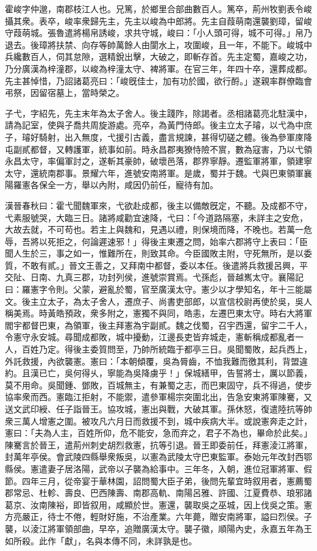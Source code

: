 
\begin{pinyinscope}
霍峻字仲邈，南郡枝江人也。兄篤，於鄉里合部曲數百人。篤卒，荊州牧劉表令峻攝其衆。表卒，峻率衆歸先主，先主以峻為中郎將。先主自葭萌南還襲劉璋，留峻守葭萌城。張魯遣將楊帛誘峻，求共守城，峻曰：「小人頭可得，城不可得。」帛乃退去。後璋將扶禁、向存等帥萬餘人由閬水上，攻圍峻，且一年，不能下。峻城中兵纔數百人，伺其怠隙，選精銳出擊，大破之，即斬存首。先主定蜀，嘉峻之功，乃分廣漢為梓潼郡，以峻為梓潼太守、裨將軍。在官三年，年四十卒，還葬成都。先主甚悼惜，乃詔諸葛亮曰：「峻旣佳士，加有功於國，欲行酹。」遂親率群僚臨會弔祭，因留宿墓上，當時榮之。

子弋，字紹先，先主末年為太子舍人。後主踐阼，除謁者。丞相諸葛亮北駐漢中，請為記室，使與子喬共周旋游處。亮卒，為黃門侍郎。後主立太子璿，以弋為中庶子，璿好騎射，出入無度，弋援引古義，盡言規諫，甚得切磋之體。後為參軍庲降屯副貳都督，又轉護軍，統事如前。時永昌郡夷獠恃險不賔，數為寇害，乃以弋領永昌太守，率偏軍討之，遂斬其豪帥，破壞邑落，郡界寧靜。遷監軍將軍，領建寧太守，還統南郡事。景耀六年，進號安南將軍。是歲，蜀并于魏。弋與巴東領軍襄陽羅憲各保全一方，舉以內附，咸因仍前任，寵待有加。

漢晉春秋曰：霍弋聞魏軍來，弋欲赴成都，後主以備敵旣定，不聽。及成都不守，弋素服號哭，大臨三日。諸將咸勸宜速降，弋曰：「今道路隔塞，未詳主之安危，大故去就，不可苟也。若主上與魏和，見遇以禮，則保境而降，不晚也。若萬一危辱，吾將以死拒之，何論遲速邪！」得後主東遷之問，始率六郡將守上表曰：「臣聞人生於三，事之如一，惟難所在，則致其命。今臣國敗主附，守死無所，是以委質，不敢有貳。」晉文王善之，又拜南中都督，委以本任。後遣將兵救援呂興，平交阯、日南、九真三郡，功封列侯，進號崇賞焉。弋孫彪，晉越嶲太守。襄陽記曰：羅憲字令則。父蒙，避亂於蜀，官至廣漢太守。憲少以才學知名，年十三能屬文。後主立太子，為太子舍人，遷庶子、尚書吏部郎，以宣信校尉再使於吳，吳人稱美焉。時黃皓預政，衆多附之，憲獨不與同，皓恚，左遷巴東太守。時右大將軍閻宇都督巴東，為領軍，後主拜憲為宇副貳。魏之伐蜀，召宇西還，留宇二千人，令憲守永安城。尋聞成都敗，城中擾動，江邊長吏皆弃城走，憲斬稱成都亂者一人，百姓乃定。得後主委質問至，乃帥所統臨于都亭三日。吳聞蜀敗，起兵西上，外託救援，內欲襲憲。憲曰：「本朝傾覆，吳為脣齒，不恤我難而徼其利，背盟違約。且漢已亡，吳何得乆，寧能為吳降虜乎！」保城繕甲，告誓將士，厲以節義，莫不用命。吳聞鍾、鄧敗，百城無主，有兼蜀之志，而巴東固守，兵不得過，使步協率衆而西。憲臨江拒射，不能禦，遣參軍楊宗突圍北出，告急安東將軍陳騫，又送文武印綬、任子詣晉王。協攻城，憲出與戰，大破其軍。孫休怒，復遣陸抗等帥衆三萬人增憲之圍。被攻凡六月日而救援不到，城中疾病大半。或說憲奔走之計，憲曰：「夫為人主，百姓所仰，危不能安，急而弃之，君子不為也，畢命於此矣。」陳騫言於晉王，遣荊州刺史胡烈救憲，抗等引退。晉王即委前任，拜憲淩江將軍，封萬年亭侯。會武陵四縣舉衆叛吳，以憲為武陵太守巴東監軍。泰始元年改封西鄂縣侯。憲遣妻子居洛陽，武帝以子襲為給事中。三年冬，入朝，進位冠軍將軍、假節。四年三月，從帝宴于華林園，詔問蜀大臣子弟，後問先輩宜時叙用者，憲薦蜀郡常忌、杜軫、壽良、巴西陳壽、南郡高軌、南陽呂雅、許國、江夏費恭、琅邪諸葛京、汝南陳裕，即皆叙用，咸顯於世。憲還，襲取吳之巫城，因上伐吳之策。憲方亮嚴正，待士不倦，輕財好施，不治產業。六年薨，贈安南將軍，謚曰烈侯。子襲，以淩江將軍領部曲，早卒，追贈廣漢太守。襲子徽，順陽內史，永嘉五年為王如所殺。此作「獻」，名與本傳不同，未詳孰是也。


\end{pinyinscope}